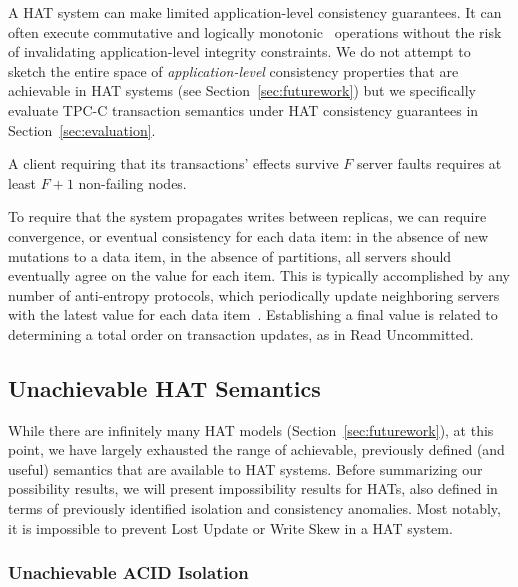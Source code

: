 \vspace{0.5em}
 A HAT system can make limited
application-level consistency guarantees. It can often execute
commutative and logically monotonic~\cite{calm} operations without the
risk of invalidating application-level integrity constraints. We do
not attempt to sketch the entire space of \textit{application-level}
consistency properties that are achievable in HAT systems (see
Section~\ref{sec:futurework}) but we specifically evaluate TPC-C
transaction semantics under HAT consistency guarantees in
Section~\ref{sec:evaluation}.

\vspace{.5em} A client requiring that its
transactions' effects survive $F$ server faults requires at least
$F+1$ non-failing nodes.

\vspace{.5em} To require that the
system propagates writes between replicas, we can require convergence,
or eventual consistency for each data item: in the absence of new
mutations to a data item, in the absence of partitions, all servers
should eventually agree on the value for each item. This is typically
accomplished by any number of anti-entropy protocols, which
periodically update neighboring servers with the latest value for each
data item~\cite{antientropy}. Establishing a final value is related to
determining a total order on transaction updates, as in Read
Uncommitted.

\subsection{Unachievable HAT Semantics}
\label{sec:unachievable-hat}

While there are infinitely many HAT models
(Section~\ref{sec:futurework}), at this point, we have largely
exhausted the range of achievable, previously defined (and useful)
semantics that are available to HAT systems. Before summarizing our
possibility results, we will present impossibility results for HATs,
also defined in terms of previously identified isolation and
consistency anomalies. Most notably, it is impossible to
prevent Lost Update or Write Skew in a HAT system.

\subsubsection{Unachievable ACID Isolation}

